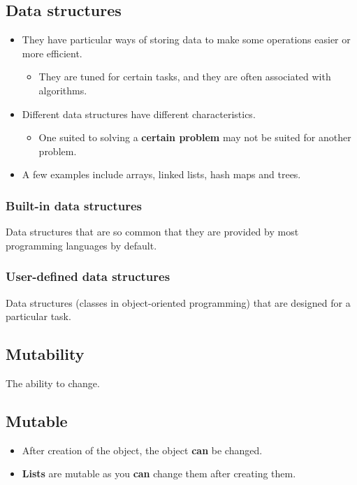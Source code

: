 \documentclass[11pt]{article}
\begin{document}
\subsection{Data structures}
\label{sec:org25ca229}
\begin{itemize}
\item They have particular ways of storing data to make some operations easier or more efficient.
\begin{itemize}
\item They are tuned for certain tasks, and they are often associated with algorithms.
\end{itemize}
\item Different data structures have different characteristics.
\begin{itemize}
\item One suited to solving a \textbf{certain problem} may not be suited for another problem.
\end{itemize}
\item A few examples include arrays, linked lists, hash maps and trees.
\end{itemize}

\subsubsection{Built-in data structures}
\label{sec:org6e60b8f}
Data structures that are so common that they are provided by most programming languages by default.

\subsubsection{User-defined data structures}
\label{sec:org9843ac3}
Data structures (classes in object-oriented programming) that are designed for a particular task.

\subsection{Mutability}
\label{sec:org10d3dbc}
The ability to change.

\subsection{Mutable}
\label{sec:orgef7038b}
\begin{itemize}
\item After creation of the object, the object \textbf{can} be changed.
\item \textbf{Lists} are mutable as you \textbf{can} change them after creating them.
\end{itemize}
\end{document}
